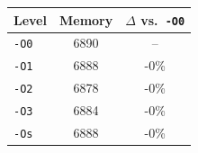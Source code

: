 \begin{tabular*}{\columnwidth}{@{\extracolsep\fill}lcc@{\extracolsep\fill}}
\toprule
\textbf{Level} & \textbf{Memory} & \textbf{$\Delta$ vs.\ \texttt{-O0}} \\
\midrule
\texttt{-O0} & 6890 & -- \\
\texttt{-O1} & 6888 & -0\% \\
\texttt{-O2} & 6878 & -0\% \\
\texttt{-O3} & 6884 & -0\% \\
\texttt{-Os} & 6888 & -0\% \\
\bottomrule
\end{tabular*}
